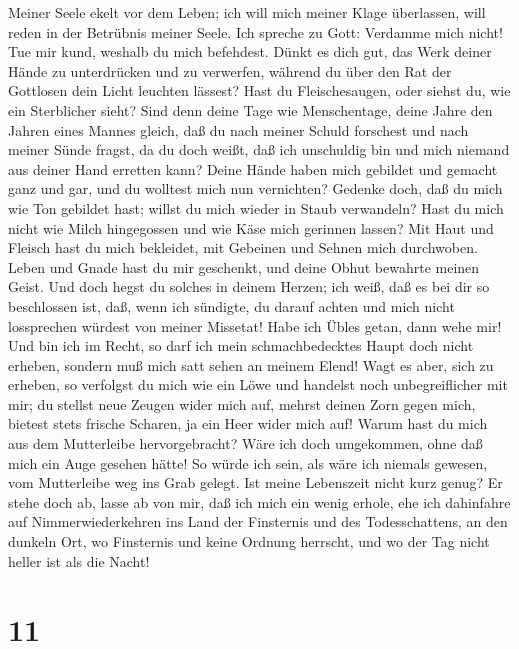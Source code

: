  Meiner Seele ekelt vor dem Leben; ich will mich meiner
Klage überlassen, will reden in der Betrübnis meiner Seele.
 Ich spreche zu Gott: Verdamme mich nicht! Tue mir kund,
weshalb du mich befehdest.  Dünkt es dich gut, das Werk
deiner Hände zu unterdrücken und zu verwerfen, während du über den Rat
der Gottlosen dein Licht leuchten lässest?  Hast du
Fleischesaugen, oder siehst du, wie ein Sterblicher sieht?
 Sind denn deine Tage wie Menschentage, deine Jahre den
Jahren eines Mannes gleich,  daß du nach meiner Schuld
forschest und nach meiner Sünde fragst,  da du doch weißt,
daß ich unschuldig bin und mich niemand aus deiner Hand erretten kann?
 Deine Hände haben mich gebildet und gemacht ganz und gar,
und du wolltest mich nun vernichten?  Gedenke doch, daß du
mich wie Ton gebildet hast; willst du mich wieder in Staub verwandeln?
 Hast du mich nicht wie Milch hingegossen und wie Käse
mich gerinnen lassen?  Mit Haut und Fleisch hast du mich
bekleidet, mit Gebeinen und Sehnen mich durchwoben. 
Leben und Gnade hast du mir geschenkt, und deine Obhut bewahrte meinen
Geist.  Und doch hegst du solches in deinem Herzen; ich
weiß, daß es bei dir so beschlossen ist, daß,  wenn ich
sündigte, du darauf achten und mich nicht lossprechen würdest von meiner
Missetat!  Habe ich Übles getan, dann wehe mir! Und bin
ich im Recht, so darf ich mein schmachbedecktes Haupt doch nicht
erheben, sondern muß mich satt sehen an meinem Elend! 
Wagt es aber, sich zu erheben, so verfolgst du mich wie ein Löwe und
handelst noch unbegreiflicher mit mir;  du stellst neue
Zeugen wider mich auf, mehrst deinen Zorn gegen mich, bietest stets
frische Scharen, ja ein Heer wider mich auf!  Warum hast
du mich aus dem Mutterleibe hervorgebracht? Wäre ich doch umgekommen,
ohne daß mich ein Auge gesehen hätte!  So würde ich sein,
als wäre ich niemals gewesen, vom Mutterleibe weg ins Grab gelegt.
 Ist meine Lebenszeit nicht kurz genug? Er stehe doch ab,
lasse ab von mir, daß ich mich ein wenig erhole,  ehe ich
dahinfahre auf Nimmerwiederkehren ins Land der Finsternis und des
Todesschattens,  an den dunkeln Ort, wo Finsternis und
keine Ordnung herrscht, und wo der Tag nicht heller ist als die Nacht!

\hypertarget{section-10}{%
\section{11}\label{section-10}}

